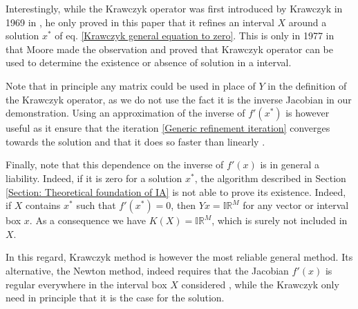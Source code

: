 \documentclass[
11pt, %
english, %
singlespacing, %
nolistspacing, %
liststotoc, %
headsepline, %
]{MastersDoctoralThesis} %
\begin{document}
Interestingly, while the Krawczyk operator was first introduced by Krawczyk in 1969 in \cite{krawczyk1969newton}, he only proved in this paper that it refines an interval $X$ around a solution $x^*$ of eq. \eqref{Krawczyk general equation to zero}. This is only in 1977 in \cite{moore1977test} that Moore made the observation and proved that Krawczyk operator can be used to determine the existence or absence of solution in a interval.

Note that in principle any matrix could be used in place of $Y$ in the definition of the Krawczyk operator, as we do not use the fact it is the inverse Jacobian in our demonstration. Using an approximation of the inverse of $f'(x^*)$ is however useful as it ensure that the iteration \eqref{Generic refinement iteration} converges towards the solution and that it does so faster than linearly \cite{krawczyk1969newton}.

Finally, note that this dependence on the inverse of $f'(x)$ is in general a liability. Indeed, if it is zero for a solution $x^*$, the algorithm described in Section \ref{Section: Theoretical foundation of IA} is not able to prove its existence. Indeed, if $X$ contains $x^*$ such that $f'(x^*) = 0$, then $Y x = \mathbb{IR}^M$ for any vector or interval box $x$. As a consequence we have $K(X) = \mathbb{IR}^M$, which is surely not included in $X$.

In this regard, Krawczyk method is however the most reliable general method. Its alternative, the Newton method, indeed requires that the Jacobian $f'(x)$ is regular everywhere in the interval box $X$ considered \cite{moore2009introduction, tucker2011validated}, while the Krawczyk only need in principle that it is the case for the solution.


\printbibliography[heading=bibintoc]{}

\end{document}
